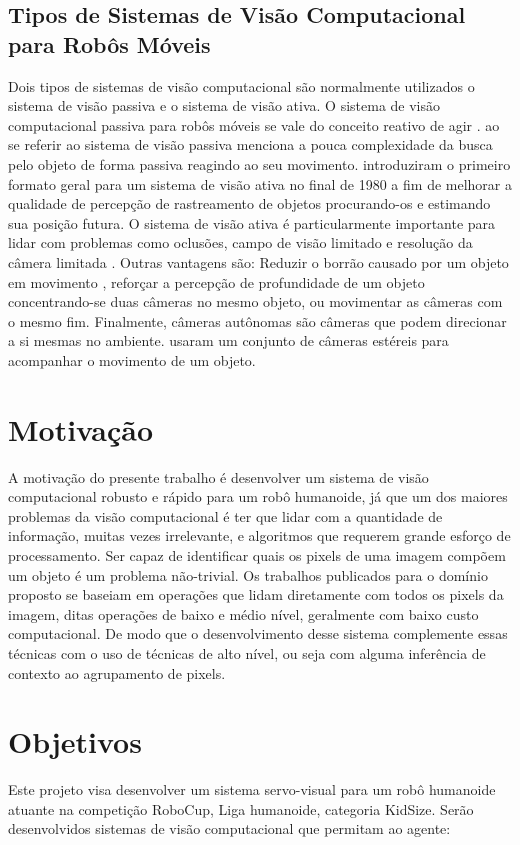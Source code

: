 \subsection{Tipos de Sistemas de Visão Computacional para Robôs Móveis}

Dois tipos de sistemas de visão computacional são normalmente utilizados o sistema de visão passiva e o sistema de visão ativa. O sistema de visão computacional passiva para robôs móveis se vale do conceito reativo de agir \cite{Tsotsos}.  ao se referir ao sistema de visão passiva menciona a pouca complexidade da busca pelo objeto de forma passiva reagindo ao seu movimento.  introduziram o primeiro formato geral para um sistema de visão ativa no final de 1980 a fim de melhorar a qualidade de percepção de rastreamento de objetos procurando-os e estimando sua posição futura. O sistema de visão ativa é particularmente importante para lidar com problemas como oclusões, campo de visão limitado e resolução da câmera limitada \cite{Denzler}.  Outras vantagens são: Reduzir o borrão causado por um objeto em movimento \cite{Rivlin}, reforçar a percepção de profundidade de um objeto concentrando-se duas câmeras no mesmo objeto, ou movimentar as câmeras \cite{Aloimonos} com o mesmo fim. Finalmente, câmeras autônomas são câmeras que podem direcionar a si mesmas no ambiente.  usaram um conjunto de câmeras estéreis para acompanhar o movimento de um objeto.

\section{Motivação}
\label{Mot}
A motivação do presente trabalho é desenvolver um sistema de visão computacional robusto e rápido para um robô humanoide, já que um dos maiores problemas da visão computacional é ter que lidar com a quantidade de informação, muitas vezes irrelevante, e algoritmos que requerem grande 
esforço de processamento. Ser capaz de identificar quais os pixels de uma imagem compõem um objeto é um problema não-trivial. Os trabalhos publicados para o domínio proposto se baseiam em operações que lidam diretamente com todos os pixels da imagem, ditas operações de baixo e médio nível, geralmente com baixo custo computacional. De modo que o desenvolvimento desse sistema complemente essas técnicas com o uso de técnicas de alto nível, ou seja com alguma inferência de contexto ao agrupamento de pixels.


\section{Objetivos}
\label{Obj}
Este projeto visa desenvolver um sistema servo-visual para um robô humanoide atuante na competição RoboCup, Liga humanoide, categoria KidSize. Serão desenvolvidos sistemas de visão computacional que permitam ao agente:

